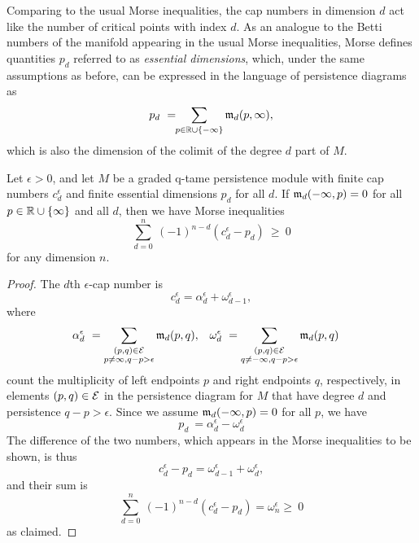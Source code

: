 Comparing to the usual Morse inequalities, the cap numbers in dimension $d$ act like the number of critical points with index $d$.
As an analogue to the Betti numbers of the manifold appearing in the usual Morse inequalities, Morse defines quantities $p_{d}$ referred to as \emph{essential dimensions}, which, under the same assumptions as before, can be expressed in the language of persistence diagrams as
\[
p_{d} \ = \!\! \sum_{p \in \mathbb{R} \cup \{-\infty\}} \mathfrak{m}_d(p,\infty),
\]
which is also the dimension of the colimit of the degree $d$ part of $M$.

\begin{thm} \label{t:inequalities}
	Let $\epsilon > 0$, and let $M$ be a graded q-tame persistence module
	with finite cap numbers $c_{d}^{\epsilon}$ and finite essential dimensions $p_{d}$ for all $d$.
	If $\mathfrak{m}_d(-\infty, p) = 0$ for all $p \in \mathbb{R} \cup \{\infty\}$ and all $d$, then we have Morse inequalities
	\begin{equation} \label{e:morse inequalities}
	\sum_{d=0}^n \ (-1)^{n-d} (c_{d}^{\epsilon} - p_{d}) \ \geq\ 0
	\end{equation}
	for any dimension $n$.
\end{thm}


\begin{proof}
The $d$th $\epsilon$-cap number is
\[c_{d}^{\epsilon} = \alpha_{d}^{\epsilon} + \omega_{d-1}^{\epsilon},\] 
where
\begin{align*}
\alpha_{d}^{\epsilon} \ &=
\sum_{\substack{(p,q) \in \mathcal{E} \\ p\neq\infty, q - p > \epsilon}} \mathfrak{m}_d(p, q),
&
\omega_{d}^{\epsilon} \ &=
\sum_{\substack{(p,q) \in \mathcal{E} \\ q\neq-\infty, q - p > \epsilon}} \mathfrak{m}_{d}(p, q)
\end{align*}
count the multiplicity of left endpoints $p$ and right endpoints $q$, respectively, in elements $(p,q) \in \mathcal{E}$ in the persistence diagram for $M$ that have degree $d$ and persistence $q-p > \epsilon$.
Since we assume $\mathfrak{m}_d(-\infty, p) = 0$ for all $p$, we have
	\begin{equation*}
	p_{d} \ = \alpha_{d}^{\epsilon} - \omega_{d}^{\epsilon}
	\end{equation*}
The difference of the two numbers, which appears in the Morse inequalities to be shown, is thus
\[
c_{d}^{\epsilon} - p_{d} = \omega_{d-1}^{\epsilon} + \omega_{d}^{\epsilon},
\]
and their sum is
\[
\sum_{d=0}^n \ (-1)^{n-d} (c_{d}^{\epsilon} - p_{d}) = \omega_{n}^{\epsilon} \geq\ 0
\]
as claimed.
\end{proof}

